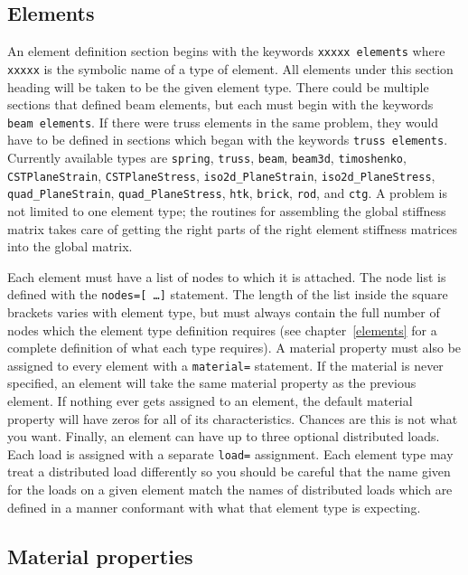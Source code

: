 \subsection{Elements}

An element definition section begins with the keywords {\tt xxxxx elements}
where {\tt xxxxx} is the symbolic name of a type of element.  All elements
under this section heading will be taken to be the given element type.
There could be multiple sections that defined beam elements, but each must
begin with the keywords {\tt beam elements}.  If there were truss elements
in the same problem, they would have to be defined in sections which began
with the keywords {\tt truss elements}.  Currently available types 
are {\tt spring}, {\tt truss}, {\tt beam}, {\tt beam3d}, {\tt timoshenko}, 
{\tt CSTPlaneStrain}, {\tt CSTPlaneStress}, {\tt iso2d\_PlaneStrain}, 
{\tt iso2d\_PlaneStress}, {\tt quad\_PlaneStrain}, {\tt quad\_PlaneStress},
{\tt htk}, {\tt brick}, {\tt rod}, and {\tt ctg}.  A \felt{} problem 
is not limited to one element type; the routines for assembling the global 
stiffness matrix takes care of getting the right parts of the right element 
stiffness matrices into the global matrix.  

Each element must have a list of 
nodes to which it is attached.  The node list is defined with the 
\mbox{{\tt nodes=[ \ldots ]}} statement. The length of the list inside the
square brackets varies with element 
type, but must always contain the full number of nodes which the element type 
definition requires (see chapter~\ref{elements} for a complete definition of 
what each type requires).  A material property must also be assigned to every 
element with a {\tt material=} statement.  If the material is never specified, 
an element will take the same material property as the previous element. 
If nothing ever gets assigned to an element, the default material property will 
have zeros for all of its 
characteristics.  Chances are this is not what you want.  Finally, an
element can have up to three optional distributed loads. Each load is assigned
with a separate {\tt load=} assignment.  Each element type may 
treat a distributed load differently so you should be careful that the name 
given for the loads on a given element match the names of distributed loads 
which are defined in a manner conformant with what that element type is 
expecting.	

\subsection{Material properties}

